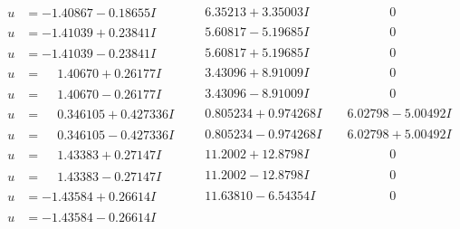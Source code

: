 \documentclass[1p]{elsarticle_modified}
\theoremstyle{definition}
\begin{document}
$$\begin{array}{c|c|c}
 \hline 
\begin{aligned}
u &= -1.40867 - 0.18655 I\end{aligned}
 & \phantom{-}6.35213 + 3.35003 I & \phantom{-0.000000 } 0 \\ \hline\begin{aligned}
u &= -1.41039 + 0.23841 I\end{aligned}
 & \phantom{-}5.60817 - 5.19685 I & \phantom{-0.000000 } 0 \\ \hline\begin{aligned}
u &= -1.41039 - 0.23841 I\end{aligned}
 & \phantom{-}5.60817 + 5.19685 I & \phantom{-0.000000 } 0 \\ \hline\begin{aligned}
u &= \phantom{-}1.40670 + 0.26177 I\end{aligned}
 & \phantom{-}3.43096 + 8.91009 I & \phantom{-0.000000 } 0 \\ \hline\begin{aligned}
u &= \phantom{-}1.40670 - 0.26177 I\end{aligned}
 & \phantom{-}3.43096 - 8.91009 I & \phantom{-0.000000 } 0 \\ \hline\begin{aligned}
u &= \phantom{-}0.346105 + 0.427336 I\end{aligned}
 & \phantom{-}0.805234 + 0.974268 I & \phantom{-}6.02798 - 5.00492 I \\ \hline\begin{aligned}
u &= \phantom{-}0.346105 - 0.427336 I\end{aligned}
 & \phantom{-}0.805234 - 0.974268 I & \phantom{-}6.02798 + 5.00492 I \\ \hline\begin{aligned}
u &= \phantom{-}1.43383 + 0.27147 I\end{aligned}
 & \phantom{-}11.2002 + 12.8798 I & \phantom{-0.000000 } 0 \\ \hline\begin{aligned}
u &= \phantom{-}1.43383 - 0.27147 I\end{aligned}
 & \phantom{-}11.2002 - 12.8798 I & \phantom{-0.000000 } 0 \\ \hline\begin{aligned}
u &= -1.43584 + 0.26614 I\end{aligned}
 & \phantom{-}11.63810 - 6.54354 I & \phantom{-0.000000 } 0 \\ \hline\begin{aligned}
u &= -1.43584 - 0.26614 I\end{aligned}

\end{array}$$
\end{document}
